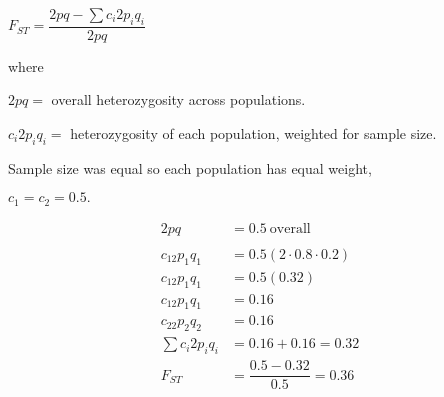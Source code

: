 \documentclass[t]{beamer}
\begin{document}
\begin{frame}
\begin{multicols}{2}
\raggedbottom
\hangpara $F_{ST} = \dfrac{2pq - \sum c_i2p_iq_i}{2pq}$

\hangpara where

\hangpara $2pq =$ overall heterozygosity across populations.

\hangpara $c_i2p_iq_i =$ heterozygosity of each population, weighted for sample size.


\hangpara Sample size was equal so each population has equal weight,

\hangpara $c_1 = c_2 = 0.5.$

\columnbreak
\noindent\begin{align*}
2pq &= 0.5\ \text{overall}\\ 
& \\
c_12p_1q_1 &= 0.5\left(2\cdot0.8\cdot0.2\right)\\
c_12p_1q_1 &= 0.5(0.32)\\
c_12p_1q_1 &= 0.16\\[1em]
c_22p_2q_2 &= 0.16\\[1em]
\sum c_i2p_iq_i &= 0.16 + 0.16 = 0.32\\[1em]
%
F_{ST} &= \dfrac{0.5 - 0.32}{0.5} = 0.36
\end{align*}

\end{multicols}
\end{frame}

\end{document}
